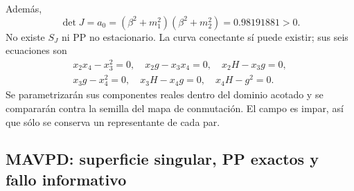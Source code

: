 Además,
\begin{equation}
 \det J=a_0=(\beta^2+m_1^2)(\beta^2+m_2^2)
 =0.98191881>0.
 \label{casegt:eq:kalman-det}
\end{equation}
No existe $S_J$ ni PP no estacionario. La curva conectante sí puede existir;
sus seis ecuaciones son
\begin{gather}
 x_2x_4-x_3^2=0,
 \quad x_2g-x_3x_4=0,
 \quad x_2H-x_3g=0,\nonumber\\
 x_3g-x_4^2=0,
 \quad x_3H-x_4g=0,
 \quad x_4H-g^2=0.
 \label{casegt:eq:kalman-CC}
\end{gather}
Se parametrizarán sus componentes reales dentro del dominio acotado y se
compararán contra la semilla del mapa de conmutación. El campo es impar, así
que sólo se conserva un representante de cada par.

\subsection{MAVPD: superficie singular, PP exactos y fallo informativo}
\label{subsec:casegt-mavpd}

